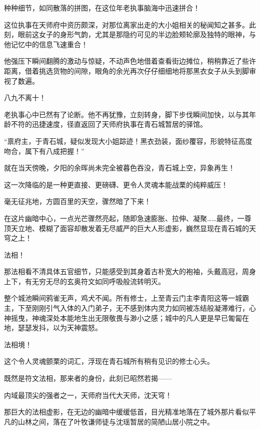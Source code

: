 种种细节，如同散落的拼图，在这位年老执事脑海中迅速拼合！

这位执事在天师府中资历颇深，对那位离家出走的大小姐相关的秘闻知之甚多。此刻，眼前这女子的身形气韵，尤其是那隐约可见的半边脸颊轮廓及独特的眼神，与他记忆中的信息飞速重合！

他强压下瞬间翻腾的激动与惊疑，不动声色地借着查看街边摊位，稍稍靠近了些许距离，借着挑选货物的间隙，眼角的余光再次仔仔细细地将那黑衣女子从头到脚审视了数遍。

八九不离十！

老执事心中已然有了论断。他不再犹豫，立刻转身，脚下步伐瞬间加快，以与其年龄不符的迅捷速度，径直返回了天师府执事在青石城暂居的驿馆。

\vspace{2em}

“禀府主，于青石城，疑似发现大小姐踪迹！黑衣劲装，面纱覆容，形貌特征高度吻合，属下有八成把握！”

\vspace{2em}

就在当天傍晚，夕阳的余晖尚未完全被暮色吞没，青石城上空，异象再生！

这一次降临的是一种更直接、更磅礴、更令人灵魂本能战栗的纯粹威压！

毫无征兆地，方圆百里的天空，骤然暗了下来！

在这片幽暗中心，一点光芒骤然亮起，随即急速膨胀、拉伸、凝聚……最终，一尊顶天立地、模糊了面容却散发着无尽威严的巨大人形虚影，巍然显现在青石城的天穹之上！

法相！

那法相看不清具体五官细节，只能感受到其身着古朴宽大的袍袖，头戴高冠，周身上下，有无穷无尽的玄奥符文如同呼吸般流转明灭。

整个城池瞬间鸦雀无声，鸡犬不闻。所有修士，上至青云门主李青阳这等一城霸主，下至刚刚引气入体的入门弟子，无不感到体内灵力如同被冻结般凝滞难行，心神摇曳，神魂深处本能地生出无限敬畏与渺小之感；城中的凡人更是早已匍匐在地，瑟瑟发抖，以为天神震怒。

法相境！

这个令人灵魂颤栗的词汇，浮现在青石城所有稍有见识的修士心头。

既然是符文法相，那来者的身份，此刻已昭然若揭——

内域最顶尖的强者之一，天师府当代大天师，沈天穹！

\vspace{2em}

那巨大的法相虚影，在无边的幽暗中缓缓低首，目光精准地落在了城外那片看似平凡的山林之间，落在了叶牧谦师徒与沈瑶暂居的简陋山居小院之中。

